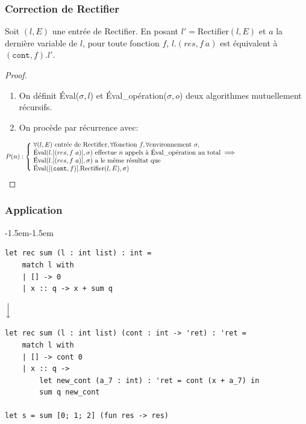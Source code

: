 \begin{frame}
    \frametitle{Correction de Rectifier}

    \begin{proposition}
        Soit $(l, E)$ une entrée de Rectifier. En posant
        $l' = \text{Rectifier}(l, E)$ et $a$ la dernière variable de $l$, pour toute
        fonction $f$, $l.(res, f\ a)$ est équivalent à $(\texttt{cont}, f).l'$.
    \end{proposition}

    \pause

    \begin{proof}
        \begin{enumerate}
            \item On définit Éval($\sigma, l$) et Éval\_opération($\sigma, o$) deux
                  algorithmes mutuellement récursifs.
            \item On procède par récurrence avec:
        \end{enumerate}

        \small
        $$
            P(n): \left \{ \ \parbox{415pt}{$\forall (l, E) \text{ entrée de Rectifier}, \forall \text{fonction } f, \forall \text{environnement } \sigma, \\
                    \text{Éval}(l.[(res, f\ a)], \sigma) \text{ effectue } n \text{ appels à Éval\_opération au total} \implies \\
                    \text{Éval}(l.[(res, f\ a)], \sigma) \text{ a le même résultat que } \\
                    \text{Éval}([(\texttt{cont}, f)].\text{Rectifier}(l, E), \sigma)$} \right .
        $$
    \end{proof}

\end{frame}

\begin{frame}[fragile]
    \frametitle{Application}

    \begin{adjustwidth}{-1.5em}{-1.5em}

        \small \begin{verbatim}
let rec sum (l : int list) : int =
    match l with
    | [] -> 0
    | x :: q -> x + sum q
        \end{verbatim}

        \vspace{0.2cm}
        \begin{center}
            $\Big\downarrow$
        \end{center}
        \vspace{0.2cm}

        \small \begin{verbatim}
let rec sum (l : int list) (cont : int -> 'ret) : 'ret =
    match l with
    | [] -> cont 0
    | x :: q ->
        let new_cont (a_7 : int) : 'ret = cont (x + a_7) in
        sum q new_cont

let s = sum [0; 1; 2] (fun res -> res)
        \end{verbatim}

    \end{adjustwidth}
\end{frame}

